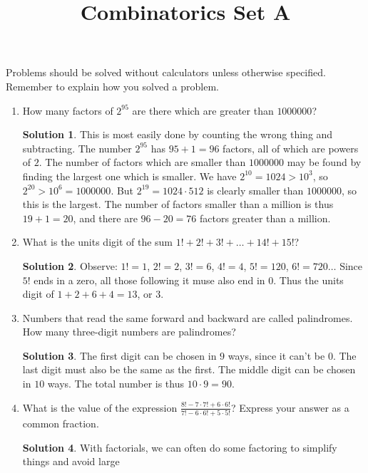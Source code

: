\documentclass{article}
\title{Combinatorics Set A}
\author{}
\date{}
\theoremstyle{definition}
\newtheorem*{solution}{Solution}
\begin{document}
    \maketitle
    \noindent Problems should be solved without calculators unless otherwise specified.
    Remember to explain how you solved a problem.
    \begin{enumerate}
        \item How many factors of $2^{95}$ are there which are greater than $1000000$?
        \begin{solution}
            This is most easily done by counting the wrong thing and subtracting. The number $2^{95}$
            has $95 + 1 = 96$ factors, all of which are powers of $2$. The number of factors
            which are smaller than $1000000$ may be found by finding the largest one which is
            smaller. We have $2^{10} = 1024 > 10^3$, so $2^{20} > 10^6 = 1000000$. But
            $2^{19} = 1024 \cdot 512$ is clearly smaller than $1000000$, so this is the largest.
            The number of factors smaller than a million is thus $19 + 1 = 20$, and there are
            $96 - 20 = 76$ factors greater than a million.
        \end{solution}
        \item What is the units digit of the sum $1! + 2! + 3! + \dots + 14! + 15!$?
        \begin{solution}
            Observe: $1! = 1$, $2! = 2$, $3! = 6$, $4! = 4$, $5! = 120$, $6! = 720 \dots$
            Since $5!$ ends in a zero, all those following it muse also end in 0. Thus the units
            digit of $1 + 2 + 6 + 4 = 13$, or $3$.
        \end{solution}
        \item Numbers that read the same forward and backward are called palindromes. How many
        three-digit numbers are palindromes?
        \begin{solution}
            The first digit can be chosen in $9$ ways, since it can't be $0$. The last digit
            must also be the same as the first. The middle digit can be chosen in $10$ ways.
            The total number is thus $10 \cdot 9 = 90$.
        \end{solution}
        \item What is the value of the expression $\frac{8! - 7 \cdot 7! + 6 \cdot 6!}
        {7! - 6 \cdot 6! + 5 \cdot 5!}$? Express your answer as a common fraction.
        \begin{solution}
            With factorials, we can often do some factoring to simplify things and avoid large

\end{solution}
\end{enumerate}
\end{document}
